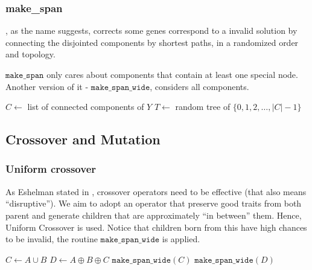 \documentclass[runningheads]{llncs}
\begin{document}
\subsubsection*{make\_span}, as the name suggests, corrects some genes correspond to a invalid solution by connecting the disjointed components by shortest paths, in a randomized order and topology. 

$\texttt{make\_span}$ only cares about components that contain at least one special node.
Another version of it - $\texttt{make\_span\_wide}$, considers all components.

\begin{algorithm}[htb]
    \caption{$\texttt{make\_span}$: Make subgraph span using shortest paths} \label{alg:gene_make_span}
    $C \gets$ list of connected components of $Y$\;
    $T \gets$ random tree of $\{0,1,2,\dots, |C|-1\}$\;
\end{algorithm}

\subsection{Crossover and Mutation}

\subsubsection*{Uniform crossover}
As Eshelman stated in \cite{eshelman1991chc}, crossover operators need to be effective (that also means ``disruptive''). We aim to adopt an operator that preserve good traits from both parent and generate children that are approximately ``in between'' them. Hence, Uniform Crossover \cite{syswerda1989uniform} is used.
Notice that children born from this have high chances to be invalid, the routine $\texttt{make\_span\_wide}$ is applied.
\begin{algorithm}
    \caption{Crossover operator} \label{alg:gene_crossover}
    $C \gets A \cup B$\;
    $D \gets A \oplus B \oplus C$\;
    $\texttt{make\_span\_wide}(C)$\;
    $\texttt{make\_span\_wide}(D)$\;
\end{algorithm}
\end{document}
